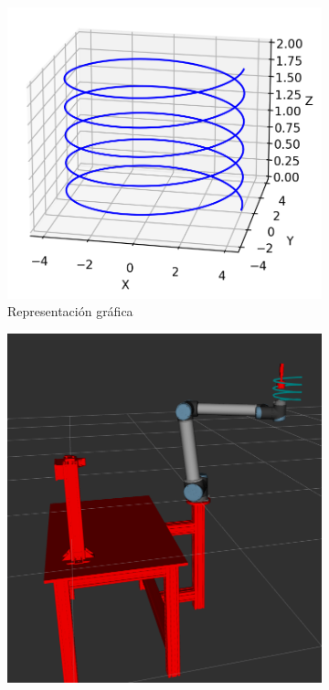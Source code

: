\begin{figure}[h!]
    \centering
     \begin{subfigure}[h]{0.45\linewidth} 
        \centering
        \includegraphics[scale=0.35]{figuras/ensayo_lectura_datos/trayectoria_sacacorchos.png}
        \caption{Representación gráfica}
        \label{fig:trayectoria_sacacorchos_representacion}
    \end{subfigure}
    \begin{subfigure}[h]{0.45\linewidth} 
        \centering
        \includegraphics[scale=0.14]{figuras/trayectoria sacacorchos entorno virtual.png}

\end{subfigure}
\end{figure}

